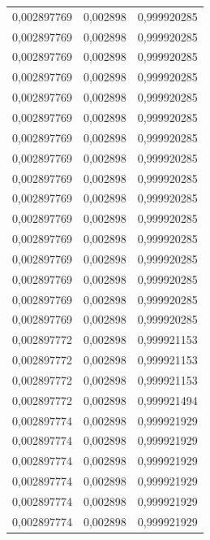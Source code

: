 \begin{center}
\begin{longtable}{|l|l|l|}
0,002897769        & 0,002898              & 0,999920285  \\
0,002897769        & 0,002898              & 0,999920285  \\
0,002897769        & 0,002898              & 0,999920285  \\
0,002897769        & 0,002898              & 0,999920285  \\
0,002897769        & 0,002898              & 0,999920285  \\
0,002897769        & 0,002898              & 0,999920285  \\
0,002897769        & 0,002898              & 0,999920285  \\
0,002897769        & 0,002898              & 0,999920285  \\
0,002897769        & 0,002898              & 0,999920285  \\
0,002897769        & 0,002898              & 0,999920285  \\
0,002897769        & 0,002898              & 0,999920285  \\
0,002897769        & 0,002898              & 0,999920285  \\
0,002897769        & 0,002898              & 0,999920285  \\
0,002897769        & 0,002898              & 0,999920285  \\
0,002897769        & 0,002898              & 0,999920285  \\
0,002897769        & 0,002898              & 0,999920285  \\
0,002897772        & 0,002898              & 0,999921153  \\
0,002897772        & 0,002898              & 0,999921153  \\
0,002897772        & 0,002898              & 0,999921153  \\
0,002897772        & 0,002898              & 0,999921494  \\
0,002897774        & 0,002898              & 0,999921929  \\
0,002897774        & 0,002898              & 0,999921929  \\
0,002897774        & 0,002898              & 0,999921929  \\
0,002897774        & 0,002898              & 0,999921929  \\
0,002897774        & 0,002898              & 0,999921929  \\
0,002897774        & 0,002898              & 0,999921929  \\

\end{longtable}
\end{center}
